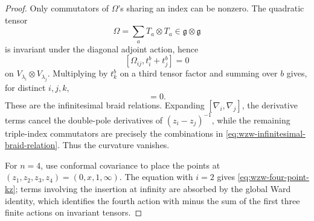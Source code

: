 \begin{proof}
Only commutators of \(\Omega\)'s sharing an index can be nonzero.  The
quadratic tensor
\[
  \Omega=\sum_a T_a\otimes T_a\in\mathfrak g\otimes\mathfrak g
\]
is invariant under the diagonal adjoint action, hence
\[
  [\Omega_{ij},t_i^b+t_j^b]=0
\]
on \(V_{\lambda_i}\otimes V_{\lambda_j}\).  Multiplying by \(t_k^b\) on a
third tensor factor and summing over \(b\) gives, for distinct \(i,j,k\),
\begin{equation}
  [\Omega_{ij},\Omega_{ik}+\Omega_{jk}]=0.
  \label{eq:wzw-infinitesimal-braid-relation}
\end{equation}
These are the infinitesimal braid relations.  Expanding
\([\nabla_i,\nabla_j]\), the derivative terms cancel the double-pole
derivatives of \((z_i-z_j)^{-1}\), while the remaining triple-index
commutators are precisely the combinations in
\eqref{eq:wzw-infinitesimal-braid-relation}.  Thus the curvature vanishes.

For \(n=4\), use conformal covariance to place the points at
\((z_1,z_2,z_3,z_4)=(0,x,1,\infty)\).  The equation with \(i=2\) gives
\eqref{eq:wzw-four-point-kz}; terms involving the insertion at infinity are
absorbed by the global Ward identity, which identifies the fourth action with
minus the sum of the first three finite actions on invariant tensors.
\end{proof}

